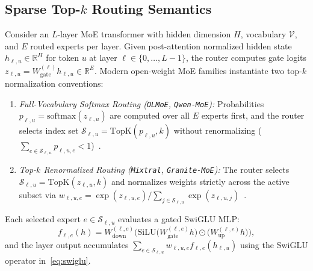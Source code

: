 \documentclass[11pt,a4paper]{article}
\renewcommand{\_}{\textunderscore\allowbreak}
\theoremstyle{definition}
\theoremstyle{remark}
\begin{document}
\subsection{Sparse Top-$k$ Routing Semantics}
Consider an $L$-layer MoE transformer with hidden dimension $H$, vocabulary $\mathcal{V}$, and $E$ routed experts per layer. Given post-attention normalized hidden state $h_{\ell, u} \in \mathbb{R}^H$ for token $u$ at layer $\ell \in \{0, \dots, L-1\}$, the router computes gate logits $z_{\ell, u} = W_{\mathrm{gate}}^{(\ell)} h_{\ell, u} \in \mathbb{R}^E$. Modern open-weight MoE families instantiate two top-$k$ normalization conventions:
\begin{enumerate}
  \item \emph{Full-Vocabulary Softmax Routing (\texttt{OLMoE}, \texttt{Qwen-MoE}):} Probabilities $p_{\ell, u} = \mathrm{softmax}(z_{\ell, u})$ are computed over all $E$ experts first, and the router selects index set $\mathcal{S}_{\ell, u} = \mathrm{TopK}(p_{\ell, u}, k)$ without renormalizing ($\sum_{e \in \mathcal{S}_{\ell, u}} p_{\ell, u, e} < 1$)~\cite{muennighoff2025olmoe,yang2024qwen2moe}.
  \item \emph{Top-$k$ Renormalized Routing (\texttt{Mixtral}, \texttt{Granite-MoE}):} The router selects $\mathcal{S}_{\ell, u} = \mathrm{TopK}(z_{\ell, u}, k)$ and normalizes weights strictly across the active subset via $w_{\ell, u, e} = \exp(z_{\ell, u, e}) / \sum_{j \in \mathcal{S}_{\ell, u}} \exp(z_{\ell, u, j})$~\cite{jiang2024mixtral,gale2023megablocks}.
\end{enumerate}
Each selected expert $e \in \mathcal{S}_{\ell, u}$ evaluates a gated SwiGLU MLP:
\begin{equation}\label{eq:swiglu}
  f_{\ell, e}(h) = W_{\mathrm{down}}^{(\ell, e)} \Big( \mathrm{SiLU}\!\big(W_{\mathrm{gate}}^{(\ell, e)} h\big) \odot \big(W_{\mathrm{up}}^{(\ell, e)} h\big) \Big),
\end{equation}
and the layer output accumulates $\sum_{e \in \mathcal{S}_{\ell, u}} w_{\ell, u, e} f_{\ell, e}(h_{\ell, u})$ using the SwiGLU operator in~\eqref{eq:swiglu}.
\end{document}
